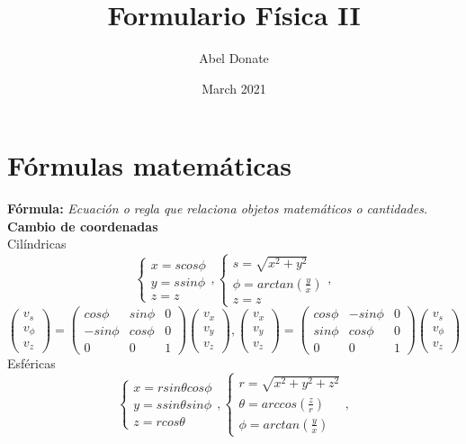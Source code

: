 \documentclass{article}
\title{Formulario Física II}
\author{Abel Donate}
\date{March 2021}
\begin{document}
\section{Fórmulas matemáticas}
\textbf{Fórmula: }\textit{Ecuación o regla que relaciona objetos matemáticos o cantidades.} \\
\textbf{Cambio de coordenadas} \\
Cilíndricas\\
\[
\begin{cases}
    x = s cos\phi \\
    y = s sin\phi \\
    z = z
\end{cases}
,
\begin{cases}
    s = \sqrt{x^2 + y^2} \\
    \phi = arctan(\frac{y}{x}) \\
    z = z
\end{cases}
,
\]
\[
\begin{pmatrix}
    v_s \\
    v_\phi \\
    v_z
\end{pmatrix}
=
\begin{pmatrix}
    cos\phi & sin\phi & 0 \\
    -sin\phi & cos\phi & 0 \\
    0 & 0 & 1
\end{pmatrix}
\begin{pmatrix}
    v_x \\
    v_y \\
    v_z
\end{pmatrix}
,
\begin{pmatrix}
    v_x \\
    v_y \\
    v_z
\end{pmatrix}
= 
\begin{pmatrix}
    cos\phi & -sin\phi & 0 \\
    sin\phi & cos\phi & 0 \\
    0 & 0 & 1
\end{pmatrix}
\begin{pmatrix}
    v_s \\
    v_\phi \\
    v_z
\end{pmatrix}
\]
Esféricas
\[
\begin{cases}
    x = r sin\theta cos\phi \\
    y = s sin\theta sin\phi \\
    z = r cos\theta
\end{cases}
,
\begin{cases}
    r = \sqrt{x^2 + y^2 + z^2} \\
    \theta = arccos(\frac{z}{r}) \\
    \phi = arctan(\frac{y}{x})
\end{cases}
,
\]
\end{document}
